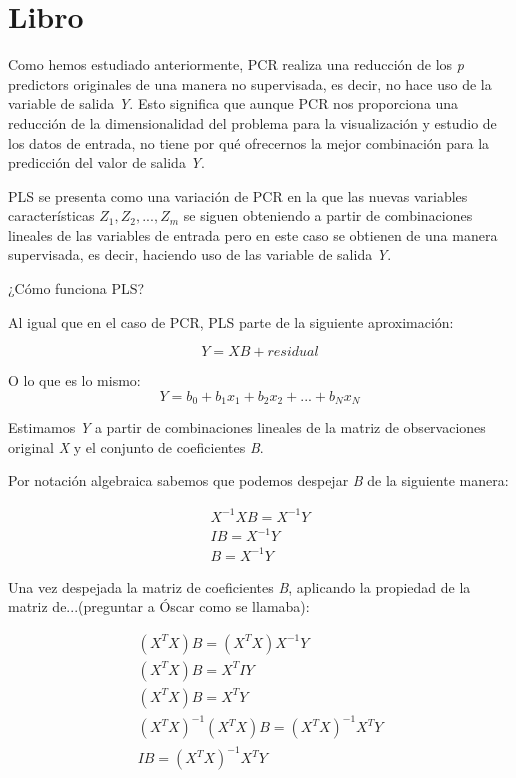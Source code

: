\documentclass[12pt,a4paper,Spanish]{book}
\begin{document}
\section{Libro}

Como hemos estudiado anteriormente, PCR realiza una reducción de los \textit{p} predictors originales de una manera no supervisada, es decir, no hace uso de la variable de salida \textit{Y}. Esto significa que aunque PCR nos proporciona una reducción de la dimensionalidad del problema para la visualización y estudio de los datos de entrada, no tiene por qué ofrecernos la mejor combinación para la predicción del valor de salida \textit{Y}.

PLS se presenta como una variación de PCR en la que las nuevas variables características $Z_1,Z_2,...,Z_m$ se siguen obteniendo a partir de combinaciones lineales de las variables de entrada pero en este caso se obtienen de una manera supervisada, es decir, haciendo uso de las variable de salida \textit{Y}.

¿Cómo funciona PLS?

Al igual que en el caso de PCR, PLS parte de la siguiente aproximación:

\begin{equation}
Y = XB+residual
\end{equation}

O lo que es lo mismo:
\begin{equation}
Y = b_0 + b_1x_1 + b_2x_2 + ... + b_Nx_N
\end{equation}


Estimamos \textit{Y} a partir de combinaciones lineales de la matriz de observaciones original \textit{X} y el conjunto de coeficientes \textit{B}.

Por notación algebraica sabemos que podemos despejar \textit{B} de la siguiente manera:

\begin{equation}
\begin{split} 
X^{-1}XB=X^{-1}Y\\
IB=X^{-1}Y\\
B=X^{-1}Y
\end{split} 
\end{equation}

Una vez despejada la matriz de coeficientes \textit{B}, aplicando la propiedad de la matriz de...(preguntar a Óscar como se llamaba):

\begin{equation}
\begin{split} 
(X^{T} X) B = (X^{T} X) X^{-1} Y \\
(X^{T} X) B = X^{T} I Y \\
(X^{T} X) B = X^{T} Y \\
(X^{T} X)^{-1} (X^{T}X) B = (X^{T} X)^{-1} X^{T} Y \\
I B = (X^{T} X)^{-1} X^{T} Y 
\end{split} 
\end{equation}
\end{document}
